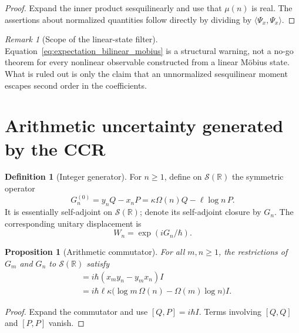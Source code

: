 \documentclass[11pt]{amsart}
\numberwithin{equation}{section}
\theoremstyle{plain}
\newtheorem{proposition}[theorem]{Proposition}
\theoremstyle{definition}
\newtheorem{definition}[theorem]{Definition}
\theoremstyle{remark}
\newtheorem{remark}[theorem]{Remark}
\newcommand{\R}{\mathbb{R}}
\newcommand{\Sch}{\mathcal{S}}
\begin{document}
\begin{proof}
Expand the inner product sesquilinearly and use that \(\mu(n)\) is real.
The assertions about normalized quantities follow directly by dividing by
\(\langle\Psi_x,\Psi_x\rangle\).
\end{proof}

\begin{remark}[Scope of the linear-state filter]
\label{rem:linear_state_filter_scope}
Equation~\eqref{eq:expectation_bilinear_mobius} is a structural warning, not a
no-go theorem for every nonlinear observable constructed from a linear
M\"obius state.  What is ruled out is only the claim that an unnormalized
sesquilinear moment escapes second order in the coefficients.
\end{remark}

\section{Arithmetic uncertainty generated by the CCR}
\label{sec:arithmetic_uncertainty}

\begin{definition}[Integer generator]
\label{def:integer_generator}
For \(n\ge1\), define on \(\Sch(\R)\) the symmetric operator
\begin{equation}
G_n^{(0)}=y_nQ-x_nP
=\kappa\Omega(n)Q-\ell\log n\,P.
\label{eq:Gn_definition}
\end{equation}
It is essentially self-adjoint on \(\Sch(\R)\); denote its self-adjoint
closure by \(G_n\).  The corresponding unitary displacement is
\begin{equation}
W_n=\exp(iG_n/\hbar).
\label{eq:Wn_from_Gn}
\end{equation}
\end{definition}

\begin{proposition}[Arithmetic commutator]
\label{prop:arithmetic_generator_commutator}
For all \(m,n\ge1\), the restrictions of \(G_m\) and \(G_n\) to \(\Sch(\R)\) satisfy
\begin{align}
[G_m,G_n]
&=i\hbar(x_my_n-y_mx_n)I
\label{eq:GmGn_commutator_xy}\\
&=i\hbar\ell\kappa
\bigl(\log m\,\Omega(n)-\Omega(m)\log n\bigr)I.
\label{eq:GmGn_commutator_arithmetic}
\end{align}
\end{proposition}

\begin{proof}
Expand the commutator and use \([Q,P]=i\hbar I\).  Terms involving
\([Q,Q]\) and \([P,P]\) vanish.
\end{proof}
\end{document}

